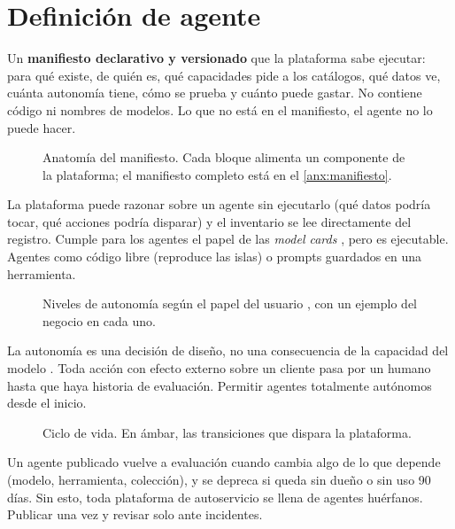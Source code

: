 \section{Definición de agente}
\label{sec:agente}
\begin{respuesta}
Un \textbf{manifiesto declarativo y versionado} que la plataforma sabe ejecutar: para qué
existe, de quién es, qué capacidades pide a los catálogos, qué datos ve, cuánta autonomía
tiene, cómo se prueba y cuánto puede gastar. No contiene código ni nombres de modelos. Lo que
no está en el manifiesto, el agente no lo puede hacer.
\end{respuesta}

\begin{figure}[!htbp]
  \centering
  
  \caption{Anatomía del manifiesto. Cada bloque alimenta un componente de la plataforma; el
  manifiesto completo está en el \cref{anx:manifiesto}.}
  \label{fig:manifiesto}
\end{figure}

{La plataforma puede razonar sobre un agente sin ejecutarlo (qué datos podría tocar, qué
acciones podría disparar) y el inventario se lee directamente del registro. Cumple para los
agentes el papel de las \emph{model cards} \citep{mitchell2019modelcards}, pero es ejecutable.}
{Agentes como código libre (reproduce las islas) o prompts guardados en una herramienta.}

\begin{figure}[!htbp]
  \centering
  
  \caption{Niveles de autonomía según el papel del usuario \citep{feng2025autonomy}, con un
  ejemplo del negocio en cada uno.}
  \label{fig:autonomia}
\end{figure}

{La autonomía es una decisión de diseño, no una consecuencia de la capacidad del modelo
\citep{feng2025autonomy}. Toda acción con efecto externo sobre un cliente pasa por un humano
hasta que haya historia de evaluación.}
{Permitir agentes totalmente autónomos desde el inicio.}

\begin{figure}[!htbp]
  \centering
  
  \caption{Ciclo de vida. En ámbar, las transiciones que dispara la plataforma.}
  \label{fig:ciclo}
\end{figure}

{Un agente publicado vuelve a evaluación cuando cambia algo de lo que depende (modelo,
herramienta, colección), y se depreca si queda sin dueño o sin uso 90 días. Sin esto, toda
plataforma de autoservicio se llena de agentes huérfanos.}
{Publicar una vez y revisar solo ante incidentes.}
